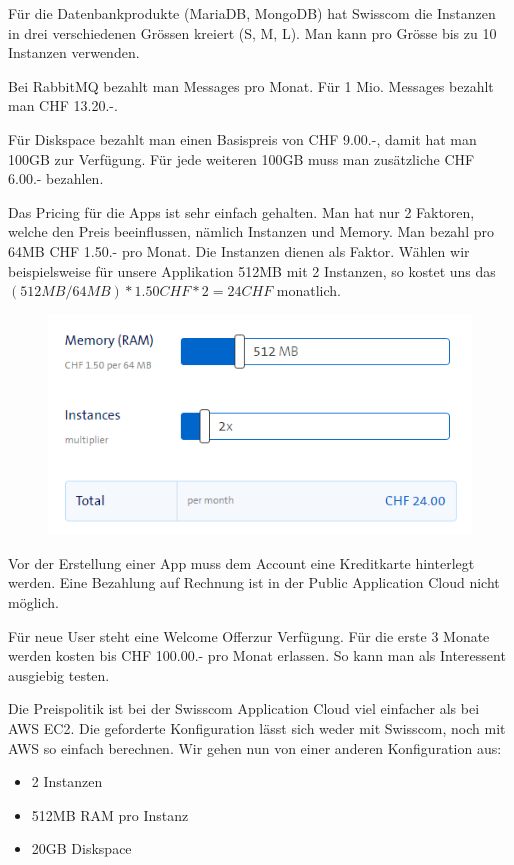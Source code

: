 Für die Datenbankprodukte (MariaDB, MongoDB) hat Swisscom die Instanzen in drei verschiedenen Grössen kreiert (S, M, L). Man kann pro Grösse bis zu 10 Instanzen verwenden. 

Bei RabbitMQ bezahlt man Messages pro Monat. Für 1 Mio. Messages bezahlt man CHF 13.20.-. 

Für Diskspace bezahlt man einen Basispreis von CHF 9.00.-, damit hat man 100GB zur Verfügung. Für jede weiteren 100GB muss man zusätzliche CHF 6.00.- bezahlen.

Das Pricing für die Apps ist sehr einfach gehalten. Man hat nur 2 Faktoren, welche den Preis beeinflussen, nämlich Instanzen und Memory. Man bezahl pro 64MB CHF 1.50.- pro Monat. Die Instanzen dienen als Faktor. Wählen wir beispielsweise für unsere Applikation 512MB mit 2 Instanzen, so kostet uns das \((512MB/64MB)*1.50CHF*2=24CHF\) monatlich.
\begin{figure}[H]
\centering
\includegraphics[scale=0.8]{images/pricepermonth.png}
\end{figure}
Vor der Erstellung einer App muss dem Account eine Kreditkarte hinterlegt werden. Eine Bezahlung auf Rechnung ist in der Public Application Cloud nicht möglich.

Für neue User steht eine \glqq Welcome Offer\grqq zur Verfügung. Für die erste 3 Monate werden kosten bis CHF 100.00.- pro Monat erlassen. So kann man als Interessent ausgiebig testen. 

Die Preispolitik ist bei der Swisscom Application Cloud viel einfacher als bei AWS EC2. Die geforderte Konfiguration lässt sich weder mit Swisscom, noch mit AWS so einfach berechnen. Wir gehen nun von einer anderen Konfiguration aus:
\begin{itemize}
\item 2 Instanzen
\item 512MB RAM pro Instanz
\item 20GB Diskspace
\end{itemize}

